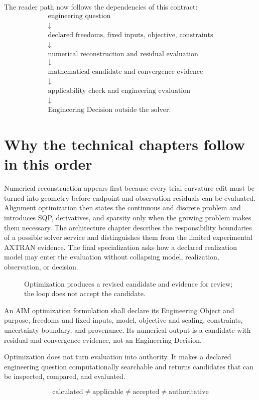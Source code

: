 The reader path now follows the dependencies of this contract:
\[
\begin{array}{c}
\text{engineering question}\\
\downarrow\\
\text{declared freedoms, fixed inputs, objective, constraints}\\
\downarrow\\
\text{numerical reconstruction and residual evaluation}\\
\downarrow\\
\text{mathematical candidate and convergence evidence}\\
\downarrow\\
\text{applicability check and engineering evaluation}\\
\downarrow\\
\text{Engineering Decision outside the solver.}
\end{array}
\]

\section*{Why the technical chapters follow in this order}

Numerical reconstruction appears first because every trial curvature edit must
be turned into geometry before endpoint and observation residuals can be
evaluated. Alignment optimization then states the continuous and discrete
problem and introduces SQP, derivatives, and sparsity only when the growing
problem makes them necessary. The architecture chapter describes the
responsibility boundaries of a possible solver service and distinguishes them
from the limited experimental AXTRAN evidence. The final specialization asks
how a declared realization model may enter the evaluation without collapsing
model, realization, observation, or decision.

\begin{figure}[ht]
\centering

\caption{Optimization produces a revised candidate and evidence for review; the loop does not accept the candidate.}
\label{fig:icon-optimization-evaluation-loop}
\end{figure}

\begin{principle}
\label{princ:optimization-principle}
An AIM optimization formulation shall declare its Engineering Object and
purpose, freedoms and fixed inputs, model, objective and scaling, constraints,
uncertainty boundary, and provenance. Its numerical output is a candidate with
residual and convergence evidence, not an Engineering Decision.
\end{principle}

\begin{summary}
Optimization does not turn evaluation into authority. It makes a declared
engineering question computationally searchable and returns candidates that
can be inspected, compared, and evaluated.

\[
\boxed{\text{calculated}\neq\text{applicable}\neq
\text{accepted}\neq\text{authoritative}}
\]
\end{summary}
